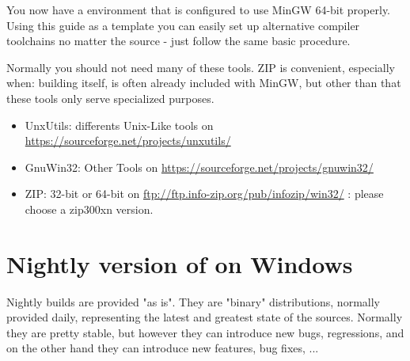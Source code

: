 

You now have a \codeblocks environment that is configured to use MinGW 64-bit properly. Using this guide as a template you can easily set up alternative compiler toolchains no matter the source - just follow the same basic procedure.

Normally you should not need many of these tools. ZIP is convenient, especially when: building \codeblocks itself, is often already included with MinGW, but other than that these tools only serve specialized purposes.
\begin{itemize}
\item UnxUtils: differents Unix-Like tools on \url{https://sourceforge.net/projects/unxutils/}
\item GnuWin32: Other Tools on \url{https://sourceforge.net/projects/gnuwin32/}
\item ZIP: 32-bit or 64-bit on \url{ftp://ftp.info-zip.org/pub/infozip/win32/} : please choose a zip300xn version.
\end{itemize}

\section{Nightly version of \codeblocks on Windows}

Nightly builds are provided "as is". They are "binary" distributions, normally provided daily, representing the latest and greatest state of the \codeblocks sources. Normally they are pretty stable, but however they can introduce new bugs, regressions, and on the other hand they can introduce new features, bug fixes, ...

